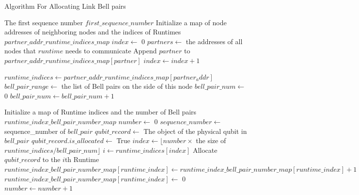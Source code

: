 \begin{algorithm}[H]  
  \caption{Algorithm For Allocating Link Bell pairs}                 
  \begin{algorithmic}[1]
    \Require The first sequence number $first\_sequence\_number$
    \State Initialize a map of node addresses of neighboring nodes and the indices of Runtimes $partner\_addr\_runtime\_indices\_map$
    \State $index \gets$ 0
      \State $partners \gets$ the addresses of all nodes that $runtime$ needs to communicate
        \State Append $partner$ to $partner\_addr\_runtime\_indices\_map[partner]$
      \EndFor
      \State $index \gets index + 1$
    \EndFor

      \State $runtime\_indices \gets partner\_addr\_runtime\_indices\_map[partner_addr]$
      \State $bell\_pair\_range \gets$ the list of Bell pairs on the side of this node
      \State $bell\_pair\_num \gets$ 0
        \State $bell\_pair\_num \gets bell\_pair\_num + 1$
      \EndFor

      \State  Initialize a map of Runtime indices and the number of Bell pairs $runtime\_index\_bell\_pair\_number\_map$
      \State $number \gets$ 0
        \State $sequence\_number \gets$ sequence\_number of $bell\_pair$
          \State $qubit\_record \gets$ The object of the physical qubit in $bell\_pair$
            \State $qubit\_record.is\_allocated \gets$ True
            \State $index \gets \lfloor number \times $ the size of $runtime\_indices / bell\_pair\_num \rfloor$
            \State $i \gets runtime\_indices[index]$
            \State Allocate $qubit\_record$ to the $i$th Runtime
              \State $runtime\_index\_bell\_pair\_number\_map[runtime\_index] \gets runtime\_index\_bell\_pair\_number\_map[runtime\_index] + 1$
            \Else
              \State $runtime\_index\_bell\_pair\_number\_map[runtime\_index] \gets$ 0
            \EndIf
          \EndIf
        \EndIf
        \State $number \gets number + 1$
      \EndFor
    \EndFor
  \end{algorithmic}
\end{algorithm}

